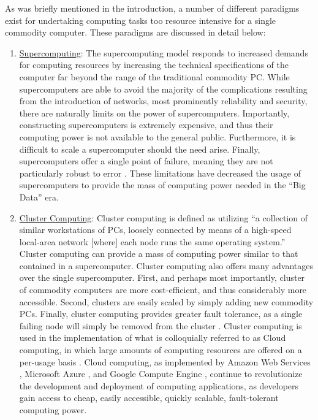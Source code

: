 As was briefly mentioned in the introduction, a number of different paradigms
exist for undertaking computing tasks too resource intensive for a single
commodity computer. These paradigms are discussed in detail below:

\begin{enumerate}
  \item \underline{Supercomputing}: The supercomputing model responds to
    increased demands for computing resources by increasing the technical
    specifications of the computer far beyond the range of the
    traditional commodity PC.
    While supercomputers are able to avoid the majority of the complications
    resulting from the introduction of networks, most prominently reliability and
    security, there are naturally limits on the power of supercomputers.
    Importantly, constructing supercomputers is extremely expensive, and thus
    their computing power is not available to the general public. Furthermore,
    it is difficult to scale a supercomputer should the need arise. Finally,
    supercomputers offer a single point of failure, meaning they are not
    particularly robust to
    error \cite{cluster-computing-the-commodity-supercomputer}.
    These limitations have decreased the usage of
    supercomputers to provide the mass of computing power needed in the ``Big
    Data'' era.

  \item \underline{Cluster Computing}: Cluster computing is defined as utilizing
    ``a collection of similar workstations of PCs, loosely connected by means of
    a high-speed local-area network [where] each node runs the same operating
    system.''\cite{distributed-systems-principles-and-paradigms}
    Cluster computing can provide a mass of computing power similar to
    that contained in a supercomputer. Cluster computing also offers many
    advantages over the single supercomputer. First, and perhaps most
    importantly, cluster of commodity computers are
    more cost-efficient, and thus considerably more
    accessible. Second, clusters are easily scaled
    by simply adding new commodity PCs.
    Finally, cluster computing provides greater fault
    tolerance, as a single failing node will simply be removed
    from the cluster \cite{cluster-based-scalable-network-services}.
    Cluster computing is used in the
    implementation of what is colloquially referred to as Cloud
    computing, in which large amounts of computing resources are offered on a
    per-usage basis \cite{distributed-systems-concepts-and-design}.
    Cloud computing, as implemented by Amazon Web
    Services \cite{amazon-web-services}, Microsoft Azure \cite{microsoft-azure},
    and Google Compute Engine \cite{google-compute-engine}, continue to
    revolutionize the development and deployment of computing applications, as
    developers gain access to cheap, easily accessible, quickly scalable,
    fault-tolerant computing power.


\end{enumerate}
